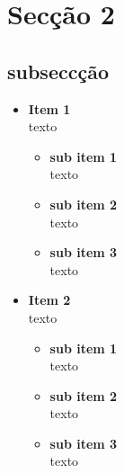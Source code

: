 \section{Secção 2} \label{section: seccao 2}

\subsection{subseccção}

\begin{itemize}

  \item \textbf{Item 1} \\
  texto
  \begin{itemize}
    \item \textbf{sub item 1}\\ texto
    \item \textbf{sub item 2}\\ texto
    \item \textbf{sub item 3}\\ texto
  \end{itemize}

  \item \textbf{Item 2} \\
  texto
  \begin{itemize}
    \item \textbf{sub item 1}\\ texto
    \item \textbf{sub item 2}\\ texto
    \item \textbf{sub item 3}\\ texto
  \end{itemize}

\end{itemize}